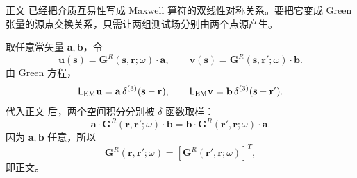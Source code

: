 \begin{derivation}

正文 已经把介质互易性写成 Maxwell 算符的双线性对称关系。要把它变成 Green 张量的源点交换关系，只需让两组测试场分别由两个点源产生。

取任意常矢量 \(\mathbf a,\mathbf b\)，令
\begin{equation*}
\mathbf u(\mathbf s)=\mathbf G^R(\mathbf s,\mathbf r;\omega)\cdot\mathbf a,
\qquad
\mathbf v(\mathbf s)=\mathbf G^R(\mathbf s,\mathbf r';\omega)\cdot\mathbf b.
\end{equation*}
由 Green 方程，
\begin{equation*}
\mathsf L_{\rm EM}\mathbf u
=\mathbf a\,\delta^{(3)}(\mathbf s-\mathbf r),
\qquad
\mathsf L_{\rm EM}\mathbf v
=\mathbf b\,\delta^{(3)}(\mathbf s-\mathbf r').
\end{equation*}
代入正文 后，两个空间积分分别被 \(\delta\) 函数取样：
\begin{equation*}
\mathbf a\cdot\mathbf G^R(\mathbf r,\mathbf r';\omega)\cdot\mathbf b
=\mathbf b\cdot\mathbf G^R(\mathbf r',\mathbf r;\omega)\cdot\mathbf a.
\end{equation*}
因为 \(\mathbf a,\mathbf b\) 任意，所以
\begin{equation*}
\mathbf G^R(\mathbf r,\mathbf r';\omega)
=[\mathbf G^R(\mathbf r',\mathbf r;\omega)]^T,
\end{equation*}
即正文。
\end{derivation}

